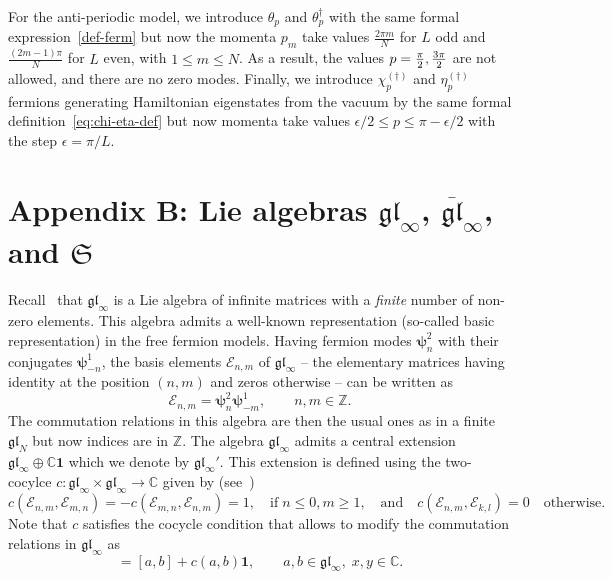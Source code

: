 \documentclass[11pt]{article}
\renewcommand{\theequation}{\thesection.\arabic{equation}}
\newcommand{\one}{\boldsymbol{1}}%
\newcommand{\ferm}{\theta}
\newcommand{\fermd}{\theta^{\dagger}}
\newcommand{\oC}{\mathbb{C}}
\newcommand{\oZ}{\mathbb{Z}}
\newcommand{\step}{\epsilon}
\newcommand{\interLie}{\mathfrak{S}}
\newcommand{\interch}{\interLie}
\newcommand{\glinf}{\gl_{\infty}}
\newcommand{\bglinf}{\overline{\gl}_{\infty}}
\newcommand{\Egl}{\mathcal{E}}
\newcommand{\gl}{\mathfrak{gl}}
\newcommand{\nfer}{\boldsymbol{\psi}}
\newcommand{\nferp}{\nfer^2}
\newcommand{\nferm}{\nfer^1}
\theoremstyle{definition}
\begin{document}
For the anti-periodic model, we  introduce $\ferm_p$ and $\fermd_p$ with the same formal expression~\eqref{def-ferm} but now the momenta $p_m$ take values $\frac{2\pi m}{N}$ for $L$ odd and $\frac{(2m-1)\pi}{N}$ for $L$ even, with $1\leq m\leq N$. As a
result, the values $p={\pi\over 2}, {3\pi\over 2}$ are not allowed, and
there are no zero modes. Finally,  we introduce
$\chi^{(\dagger)}_p$ and $\eta^{(\dagger)}_p$ fermions generating
Hamiltonian eigenstates from the vacuum by the same
formal definition~\eqref{eq:chi-eta-def}  but
now momenta take values $\step/2\leq p\leq \pi - \step/2$ with the
step $\step=\pi/L$.


\section*{Appendix B: Lie algebras  $\glinf$,  $\bglinf$, and $\interch$}\label{app:glinf}
\renewcommand\thesection{B}
\renewcommand{\theequation}{B\arabic{equation}}
\setcounter{equation}{0}
Recall~\cite{Kac-book} that $\glinf$ is a Lie algebra of  infinite matrices with a  \textit{finite} number of non-zero elements. This algebra admits a well-known representation (so-called  basic representation) in the free fermion models. Having fermion modes $\nferp_n$ with their conjugates $\nferm_{-n}$, the basis elements $\Egl_{n,m}$ of $\glinf$ -- the elementary matrices having identity at the position $(n,m)$ and zeros otherwise -- can be written as
\begin{equation}\label{basic-rep}
\Egl_{n,m} = \nferp_n\nferm_{-m}, \qquad n,m\in\oZ.
\end{equation}
 The  commutation relations in this algebra are then the usual ones as in a finite $\gl_N$ but now indices are in $\oZ$. The algebra $\glinf$ admits a central extension $\glinf \oplus \oC\one$  which we denote by $\glinf'$. This extension is defined using the two-cocylce $c:\glinf\times\glinf\to\oC$ given by (see~\cite{Kac-book})
\begin{equation}
c(\Egl_{n,m},\Egl_{m,n}) =  -c(\Egl_{m,n},\Egl_{n,m}) = 1, \quad\text{if}\; n\leq0, m\geq1,\quad \text{and}  \quad c(\Egl_{n,m},\Egl_{k,l}) = 0 \quad \text{otherwise}.
\end{equation}
Note that $c$ satisfies the cocycle condition that allows to modify the commutation relations in $\glinf$ as
\begin{equation}
[a+ x\one,b+ y\one] = [a,b] + c(a,b)\one,\qquad a,b\in\glinf, \; x,y\in\oC.
\end{equation}
\end{document}
